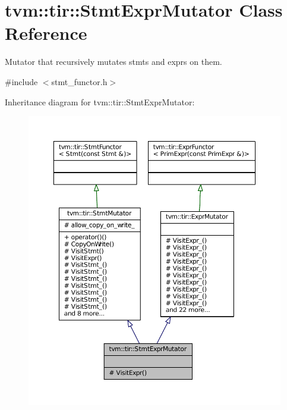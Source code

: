 \hypertarget{classtvm_1_1tir_1_1StmtExprMutator}{}\section{tvm\+:\+:tir\+:\+:Stmt\+Expr\+Mutator Class Reference}
\label{classtvm_1_1tir_1_1StmtExprMutator}


Mutator that recursively mutates stmts and exprs on them.  




{\ttfamily \#include $<$stmt\+\_\+functor.\+h$>$}



Inheritance diagram for tvm\+:\+:tir\+:\+:Stmt\+Expr\+Mutator\+:
\nopagebreak
\begin{figure}[H]
\begin{center}
\leavevmode
\includegraphics[width=350pt]{classtvm_1_1tir_1_1StmtExprMutator__inherit__graph}
\end{center}
\end{figure}


